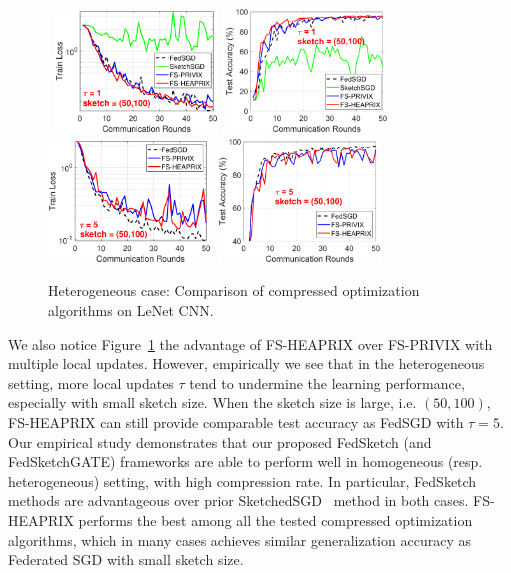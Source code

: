 \documentclass[twoside]{article}
\begin{document}
\begin{figure}[t]
\begin{center}
{		}
		\mbox{
		 \includegraphics[width=1.7in]{MNIST_figures/local1_sketch50_iid0_train_loss.eps} \hspace{-0.2in}
		\includegraphics[width=1.7in]{MNIST_figures/local1_sketch50_iid0_test_acc.eps} \hspace{-0.2in}
		}
		\mbox{
		\includegraphics[width=1.7in]{MNIST_figures/local5_sketch50_iid0_train_loss.eps}\hspace{-0.2in}
		\includegraphics[width=1.7in]{MNIST_figures/local5_sketch50_iid0_test_acc.eps}\hspace{-0.2in}
		}
	\end{center}
	\caption{Heterogeneous case: Comparison of compressed optimization algorithms on LeNet CNN.}
    \label{fig:MNIST-iid0}
\end{figure}
We also notice Figure~\ref{fig:MNIST-iid0} the advantage of FS-HEAPRIX over FS-PRIVIX with multiple local updates. 
However, empirically we see that in the heterogeneous setting, more local updates $\tau$ tend to undermine the learning performance, especially with small sketch size.  
When the sketch size is large, i.e. $(50,100)$, FS-HEAPRIX can still provide comparable test accuracy as FedSGD with $\tau=5$.
Our empirical study demonstrates that our proposed FedSketch (and FedSketchGATE) frameworks are able to perform well in homogeneous (resp. heterogeneous) setting, with high compression rate. 
In particular, FedSketch methods are advantageous over prior SketchedSGD~\cite{ivkin2019communication} method in both cases. 
FS-HEAPRIX performs the best among all the tested compressed optimization algorithms, which in many cases achieves similar generalization accuracy as Federated SGD with small sketch size. 
\end{document}
